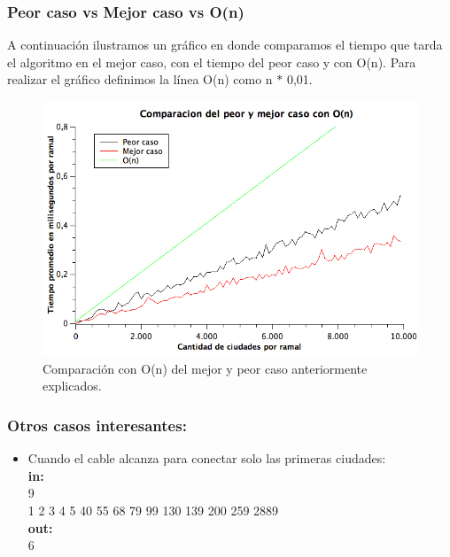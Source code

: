 \subsubsection{Peor caso vs Mejor caso vs O(n)}

A continuación ilustramos un gráfico en donde comparamos el tiempo que tarda el algoritmo en el mejor caso, con el tiempo del peor caso y con O(n). Para realizar el gráfico definimos la línea O(n) como n $*$ 0,01.

\begin{figure}[H]
\begin{center}

  \includegraphics[width=\linewidth]{../graficos/ej1/PeorYMejorCasoVsOn.png}
  \caption{{\small Comparación con O(n) del mejor y peor caso anteriormente explicados. }} \label{ej1-tiempo-vs-cant-ciudadades-mejor-peor-caso}
\endminipage

\end{center}
\end{figure}


\subsubsection{Otros casos interesantes:}
\begin{itemize}
\item Cuando el cable alcanza para conectar solo las primeras ciudades:\\
\textbf{in:}\\
9\\
1 2 3 4 5 40 55 68 79 99 130 139 200 259 2889\\
\textbf{out:}\\
6\\

\end{itemize}

